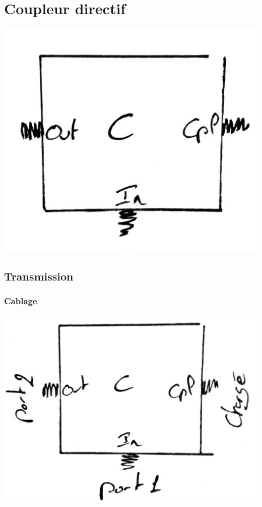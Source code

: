 \documentclass[a4paper,12pt]{report}            %
\begin{document}
\chapter{Coupleur directif}
\begin{center}\includegraphics[scale = 0.17]{pic/CD.png}\\ \end{center}

\section{Transmission}
\subsection{Cablage}
\begin{center}\includegraphics[scale = 0.17]{pic/CDIO.png}\\ \end{center}
\end{document}
